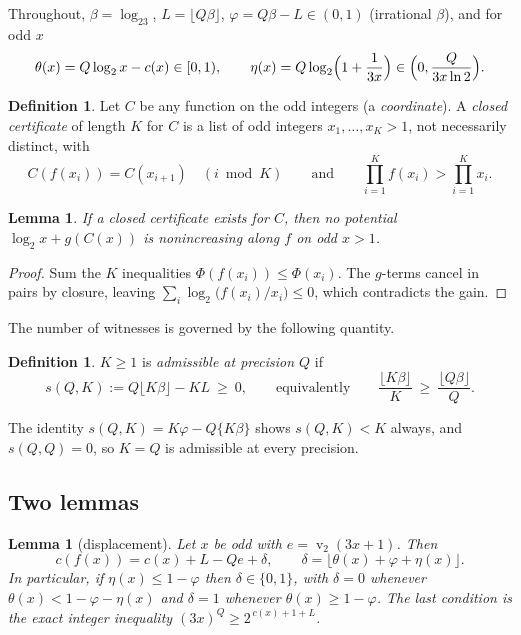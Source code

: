 \documentclass[11pt]{article}
\newtheorem{lemma}[theorem]{Lemma}
\theoremstyle{definition}
\newtheorem{definition}[theorem]{Definition}
\theoremstyle{remark}
\DeclareMathOperator{\vv}{v}
\begin{document}
Throughout, $\beta=\log_23$, $L=\lfloor Q\beta\rfloor$,
$\varphi=Q\beta-L\in(0,1)$ (irrational $\beta$), and for odd $x$
\[
\theta(x)=Q\log_2x-c(x)\in[0,1),\qquad
\eta(x)=Q\log_2\Bigl(1+\frac1{3x}\Bigr)\in\Bigl(0,\frac{Q}{3x\ln2}\Bigr).
\]

\begin{definition}\label{def:certificate}
Let $C$ be any function on the odd integers (a \emph{coordinate}). A
\emph{closed certificate} of length $K$ for $C$ is a list of odd
integers $x_1,\dots,x_K>1$, not necessarily distinct, with
\[
C(f(x_i))=C(x_{i+1})\quad(i\bmod K)\qquad\text{and}\qquad
\prod_{i=1}^{K}f(x_i)>\prod_{i=1}^{K}x_i .
\]
\end{definition}

\begin{lemma}\label{lem:certrefutes}
If a closed certificate exists for $C$, then no potential
$\log_2x+g(C(x))$ is nonincreasing along $f$ on odd $x>1$.
\end{lemma}

\begin{proof}
Sum the $K$ inequalities $\Phi(f(x_i))\le\Phi(x_i)$. The $g$-terms
cancel in pairs by closure, leaving
$\sum_i\log_2\bigl(f(x_i)/x_i\bigr)\le0$, which contradicts the gain.
\end{proof}

The number of witnesses is governed by the following quantity.

\begin{definition}\label{def:admissible}
$K\ge1$ is \emph{admissible at precision $Q$} if
\[
s(Q,K):=Q\lfloor K\beta\rfloor-KL\ \ge\ 0,
\qquad\text{equivalently}\qquad
\frac{\lfloor K\beta\rfloor}{K}\ \ge\ \frac{\lfloor Q\beta\rfloor}{Q}.
\]
\end{definition}

The identity $s(Q,K)=K\varphi-Q\{K\beta\}$ shows $s(Q,K)<K$ always,
and $s(Q,Q)=0$, so $K=Q$ is admissible at every precision.

\subsection*{Two lemmas}

\begin{lemma}[displacement]\label{lem:displacement}
Let $x$ be odd with $e=\vv_2(3x+1)$. Then
\[
c(f(x))=c(x)+L-Qe+\delta,\qquad
\delta=\bigl\lfloor\theta(x)+\varphi+\eta(x)\bigr\rfloor .
\]
In particular, if $\eta(x)\le1-\varphi$ then $\delta\in\{0,1\}$, with
$\delta=0$ whenever $\theta(x)<1-\varphi-\eta(x)$ and $\delta=1$
whenever $\theta(x)\ge1-\varphi$. The last condition is the exact
integer inequality $(3x)^{Q}\ge2^{\,c(x)+1+L}$.
\end{lemma}
\end{document}
